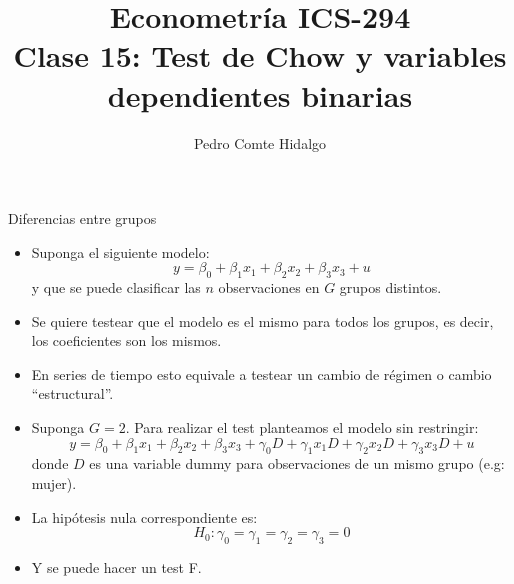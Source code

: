 \documentclass{beamer}
\title[ICS-162]{Econometría ICS-294\\ \small{Clase 15: Test de Chow y variables dependientes binarias }}
\author{Pedro Comte Hidalgo}
\institute[USM]
{Universidad Técnica Federico Santa María\\ %
	\medskip
	\textit{} %
	
}
\date{}
\begin{document}
	
\begin{frame}
	\titlepage %


\end{frame}
\logo{}

\begin{frame}[shrink=10]{ Diferencias entre grupos}
\begin{itemize}
    \item Suponga el siguiente modelo:
    \[
    y = \beta_0 + \beta_1 x_1 + \beta_2 x_2 + \beta_3 x_3 + u
    \]
    y que se puede clasificar las \(n\) observaciones en \(G\) grupos distintos.
\end{itemize}

\begin{itemize}
    \item Se quiere testear que el modelo es el mismo para todos los grupos, es decir, los coeficientes son los mismos.
    \item En series de tiempo esto equivale a testear un cambio de régimen o cambio “estructural”.
\end{itemize}

\begin{itemize}
    \item Suponga \(G = 2\). Para realizar el test planteamos el modelo sin restringir:
    \[
    y = \beta_0 + \beta_1 x_1 + \beta_2 x_2 + \beta_3 x_3 + \gamma_0 D + \gamma_1 x_1 D + \gamma_2 x_2 D + \gamma_3 x_3 D + u
    \]
    donde \(D\) es una variable dummy para observaciones de un mismo grupo (e.g: mujer).
\end{itemize}

\begin{itemize}
    \item La hipótesis nula correspondiente es:
    \[
    H_0 : \gamma_0 = \gamma_1 = \gamma_2 = \gamma_3 = 0
    \]
    \item Y se puede hacer un test F.
\end{itemize}
\end{frame}
\end{document}
